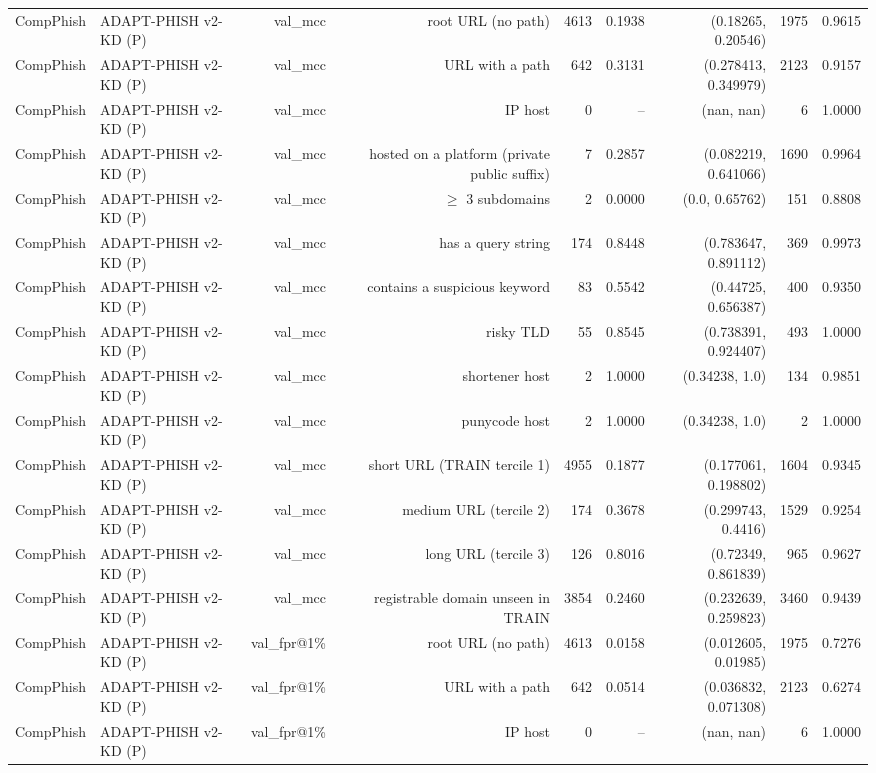 \begin{table}[t]
\begin{tabular}{llrrrrrrr}
CompPhish & ADAPT-PHISH v2-KD (P) & val\_mcc & root URL (no path) & 4613 & 0.1938 & (0.18265, 0.20546) & 1975 & 0.9615 \\
CompPhish & ADAPT-PHISH v2-KD (P) & val\_mcc & URL with a path & 642 & 0.3131 & (0.278413, 0.349979) & 2123 & 0.9157 \\
CompPhish & ADAPT-PHISH v2-KD (P) & val\_mcc & IP host & 0 & -- & (nan, nan) & 6 & 1.0000 \\
CompPhish & ADAPT-PHISH v2-KD (P) & val\_mcc & hosted on a platform (private public suffix) & 7 & 0.2857 & (0.082219, 0.641066) & 1690 & 0.9964 \\
CompPhish & ADAPT-PHISH v2-KD (P) & val\_mcc & $\geq$ 3 subdomains & 2 & 0.0000 & (0.0, 0.65762) & 151 & 0.8808 \\
CompPhish & ADAPT-PHISH v2-KD (P) & val\_mcc & has a query string & 174 & 0.8448 & (0.783647, 0.891112) & 369 & 0.9973 \\
CompPhish & ADAPT-PHISH v2-KD (P) & val\_mcc & contains a suspicious keyword & 83 & 0.5542 & (0.44725, 0.656387) & 400 & 0.9350 \\
CompPhish & ADAPT-PHISH v2-KD (P) & val\_mcc & risky TLD & 55 & 0.8545 & (0.738391, 0.924407) & 493 & 1.0000 \\
CompPhish & ADAPT-PHISH v2-KD (P) & val\_mcc & shortener host & 2 & 1.0000 & (0.34238, 1.0) & 134 & 0.9851 \\
CompPhish & ADAPT-PHISH v2-KD (P) & val\_mcc & punycode host & 2 & 1.0000 & (0.34238, 1.0) & 2 & 1.0000 \\
CompPhish & ADAPT-PHISH v2-KD (P) & val\_mcc & short URL (TRAIN tercile 1) & 4955 & 0.1877 & (0.177061, 0.198802) & 1604 & 0.9345 \\
CompPhish & ADAPT-PHISH v2-KD (P) & val\_mcc & medium URL (tercile 2) & 174 & 0.3678 & (0.299743, 0.4416) & 1529 & 0.9254 \\
CompPhish & ADAPT-PHISH v2-KD (P) & val\_mcc & long URL (tercile 3) & 126 & 0.8016 & (0.72349, 0.861839) & 965 & 0.9627 \\
CompPhish & ADAPT-PHISH v2-KD (P) & val\_mcc & registrable domain unseen in TRAIN & 3854 & 0.2460 & (0.232639, 0.259823) & 3460 & 0.9439 \\
CompPhish & ADAPT-PHISH v2-KD (P) & val\_fpr@1\% & root URL (no path) & 4613 & 0.0158 & (0.012605, 0.01985) & 1975 & 0.7276 \\
CompPhish & ADAPT-PHISH v2-KD (P) & val\_fpr@1\% & URL with a path & 642 & 0.0514 & (0.036832, 0.071308) & 2123 & 0.6274 \\
CompPhish & ADAPT-PHISH v2-KD (P) & val\_fpr@1\% & IP host & 0 & -- & (nan, nan) & 6 & 1.0000 \\

\end{tabular}
\end{table}

